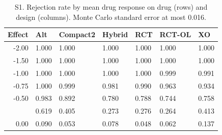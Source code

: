 \documentclass[
  11pt,
]{article}
\begin{document}
\begin{table}

\caption{\label{tab:s1-tab}S1. Rejection rate by mean drug response on drug (rows) and design (columns). Monte Carlo standard error at most 0.016.}
\centering
\begin{tabular}[t]{rllllll}
\toprule
Effect & Alt & Compact2 & Hybrid & RCT & RCT-OL & XO\\
\midrule
-2.00 & 1.000 & 1.000 & 1.000 & 1.000 & 1.000 & 1.000\\
-1.50 & 1.000 & 1.000 & 1.000 & 1.000 & 1.000 & 1.000\\
-1.00 & 1.000 & 1.000 & 1.000 & 1.000 & 0.999 & 0.991\\
-0.75 & 1.000 & 0.999 & 0.981 & 0.990 & 0.963 & 0.934\\
-0.50 & 0.983 & 0.892 & 0.780 & 0.788 & 0.744 & 0.758\\
\addlinespace
-0.25 & 0.619 & 0.405 & 0.273 & 0.276 & 0.264 & 0.413\\
0.00 & 0.090 & 0.053 & 0.078 & 0.048 & 0.062 & 0.137\\
\bottomrule
\end{tabular}
\end{table}
\end{document}
